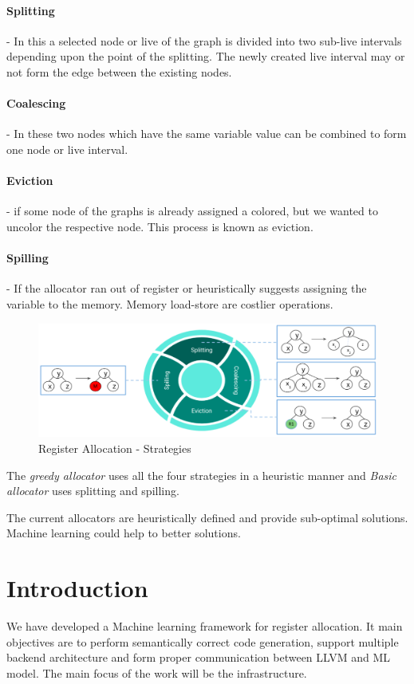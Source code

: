 \paragraph{Splitting} - In this a selected node or live of the graph is divided into two sub-live intervals depending upon the point of the splitting. The newly created live interval may or not form the edge between the existing nodes.

\paragraph{Coalescing} - In these two nodes which have the same variable value can be combined to form one node or live interval. 
\paragraph{Eviction} - if some node of the graphs is already assigned a colored, but we wanted to uncolor the respective node. This process is known as eviction.
\paragraph{Spilling} - If the allocator ran out of register or heuristically suggests assigning the variable to the memory. Memory load-store are costlier operations.

\begin{figure}[t]
    \centering
    \includegraphics[scale=0.4]{figures/chapter-5/mlra_strategies.png}
    \caption{Register Allocation - Strategies}
     \label{fig:mlra-strat}
\end{figure}

The \textit{greedy allocator} uses all the four strategies in a heuristic manner and \textit{Basic allocator} uses splitting and spilling.

The current allocators are heuristically defined and provide sub-optimal solutions. Machine learning could help to better solutions.

\section{Introduction}
We have developed a Machine learning framework for register allocation. It main objectives are to perform semantically correct code generation, support multiple backend architecture and form proper communication between LLVM and ML model. The main focus of the work will be the infrastructure.

